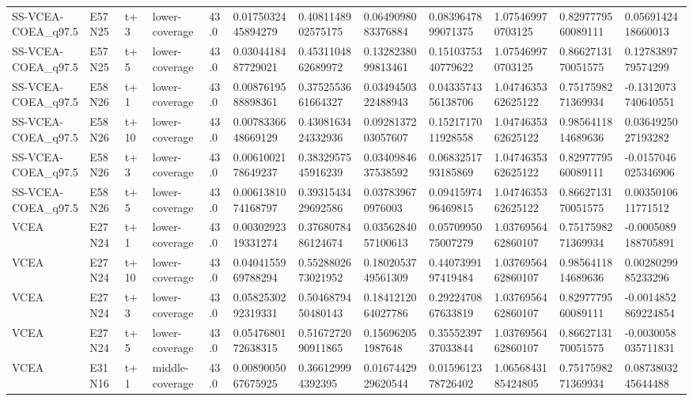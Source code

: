 \begin{landscape}
\begin{longtable}{llllllllllll}
SS-VCEA-COEA\_q97.5 & E57N25 & t+3 & lower-coverage & 43.0 & 0.0175032445894279 & 0.4081148902575175 & 0.0649098083376884 & 0.0839647899071375 & 1.075469970703125 & 0.8297779560089111 & 0.0569142418660013 \\
SS-VCEA-COEA\_q97.5 & E57N25 & t+5 & lower-coverage & 43.0 & 0.0304418487729021 & 0.4531104862689972 & 0.1328238099813461 & 0.1510375340779622 & 1.075469970703125 & 0.8662713170051575 & 0.1278389779574299 \\
SS-VCEA-COEA\_q97.5 & E58N26 & t+1 & lower-coverage & 43.0 & 0.0087619588898361 & 0.3752553661664327 & 0.0349450322488943 & 0.0433574356138706 & 1.0474635362625122 & 0.7517598271369934 & -0.1312073740640551 \\
SS-VCEA-COEA\_q97.5 & E58N26 & t+10 & lower-coverage & 43.0 & 0.0078336648669129 & 0.4308163424332936 & 0.0928137203057607 & 0.1521717011928558 & 1.0474635362625122 & 0.9856411814689636 & 0.0364925027193282 \\
SS-VCEA-COEA\_q97.5 & E58N26 & t+3 & lower-coverage & 43.0 & 0.0061002178649237 & 0.3832957545916239 & 0.0340984637538592 & 0.0683251793185869 & 1.0474635362625122 & 0.8297779560089111 & -0.0157046025346906 \\
SS-VCEA-COEA\_q97.5 & E58N26 & t+5 & lower-coverage & 43.0 & 0.0061381074168797 & 0.3931543429692586 & 0.037839670976003 & 0.0941597496469815 & 1.0474635362625122 & 0.8662713170051575 & 0.0035010611771512 \\
VCEA & E27N24 & t+1 & lower-coverage & 43.0 & 0.0030292319331274 & 0.3768078486124674 & 0.0356284057100613 & 0.0570995075007279 & 1.0376956462860107 & 0.7517598271369934 & -0.0005089188705891 \\
VCEA & E27N24 & t+10 & lower-coverage & 43.0 & 0.0404155969788294 & 0.5528802673021952 & 0.1802053749561309 & 0.4407399197419484 & 1.0376956462860107 & 0.9856411814689636 & 0.0028029985233296 \\
VCEA & E27N24 & t+3 & lower-coverage & 43.0 & 0.0582530292319331 & 0.5046879450480143 & 0.1841212064027786 & 0.2922470867633819 & 1.0376956462860107 & 0.8297779560089111 & -0.0014852869224854 \\
VCEA & E27N24 & t+5 & lower-coverage & 43.0 & 0.0547680172638315 & 0.5167272090911865 & 0.156962051987648 & 0.3555239737033844 & 1.0376956462860107 & 0.8662713170051575 & -0.0030058035711831 \\
VCEA & E31N16 & t+1 & middle-coverage & 43.0 & 0.0089005067675925 & 0.366129994392395 & 0.0167442929620544 & 0.0159612378726402 & 1.0656843185424805 & 0.7517598271369934 & 0.0873803245644488 \\

\end{longtable}
\end{landscape}
